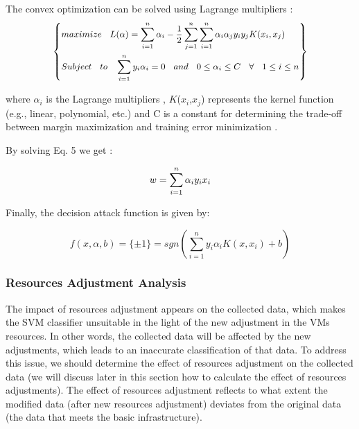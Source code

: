 \documentclass[twocolumn]{bmcart}%
\begin{document}
The convex optimization can be solved using Lagrange multipliers  \cite{scholkopf2002learning}:
\begin{equation}\small
  \left\{
  \begin{aligned}
  &maximize \hspace{0.3cm} L(\alpha) = \sum_{i=1}^{n}\alpha_{i}-\frac{1}{2}\sum_{j=1}^{n} \sum_{i=1}^{n} \alpha_{i}\alpha_{j}y_{i}y_{j}K(x_{i},x_{j}) \\
  &Subject \hspace{0.3cm} to \hspace{0.3cm} \sum_{i=1}^{n}y_{i}\alpha_{i}=0 \hspace{0.3cm} and \hspace{0.3cm} 0 \leq \alpha_{i}\leq C \hspace{0.3cm} \forall \hspace{0.3cm} 1\leq i \leq n
  \end{aligned}
  \right\}
\end{equation}

where $\alpha_{i}$ is the Lagrange multipliers \cite{han2011data}, $K$($x_{i}$,$x_{j}$) represents the kernel function (e.g., linear, polynomial, etc.) and C is a constant for determining the trade-off between margin maximization and training error minimization \cite{han2011data}.

By solving Eq. 5 we get \cite{han2011data}:

\begin{equation}\small
  w = \sum_{i=1}^{n} \alpha_{i}y_{i}x_{i}
\end{equation}

Finally, the decision attack function is given by:

\begin{equation}
f(x,\alpha,b)= \{\pm1\}=sgn(\sum_{i=1}^{n} y_{i}\alpha_{i}K(x,x_{i}) + b)
\end{equation}

\subsubsection*{Resources Adjustment Analysis}

The impact of resources adjustment appears on the collected data, which makes the SVM classifier unsuitable in the light of the new adjustment in the VMs resources. In other words, the collected data will be affected by the new adjustments, which leads to an inaccurate classification of that data. To address this issue, we should determine the effect of resources adjustment on the collected data (we will discuss later in this section how to calculate the effect of resources adjustments). The effect of resources adjustment reflects to what extent the modified data (after new resources adjustment) deviates from the original data (the data that meets the basic infrastructure).
\end{document}
